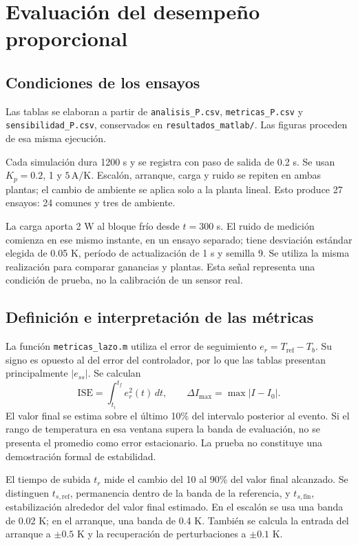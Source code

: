 \documentclass[journal,twocolumn]{IEEEtran}
\begin{document}
\section{Evaluación del desempeño proporcional}\label{sec:resultadosP}
\subsection{Condiciones de los ensayos}
Las tablas se elaboran a partir de \texttt{analisis\_P.csv}, \texttt{metricas\_P.csv} y \texttt{sensibilidad\_P.csv}, conservados en \texttt{resultados\_matlab/}. Las figuras proceden de esa misma ejecución.

Cada simulación dura 1200 s y se registra con paso de salida de 0.2 s. Se usan $K_p=0.2$, 1 y $5\,\mathrm{A/K}$. Escalón, arranque, carga y ruido se repiten en ambas plantas; el cambio de ambiente se aplica solo a la planta lineal. Esto produce 27 ensayos: 24 comunes y tres de ambiente.

La carga aporta 2 W al bloque frío desde $t=300$ s. El ruido de medición comienza en ese mismo instante, en un ensayo separado; tiene desviación estándar elegida de 0.05 K, período de actualización de 1 s y semilla 9. Se utiliza la misma realización para comparar ganancias y plantas. Esta señal representa una condición de prueba, no la calibración de un sensor real.

\subsection{Definición e interpretación de las métricas}
La función \texttt{metricas\_lazo.m} utiliza el error de seguimiento $e_r=T_{\mathrm{ref}}-T_b$. Su signo es opuesto al del error del controlador, por lo que las tablas presentan principalmente $|e_{ss}|$. Se calculan
\begin{equation}
\mathrm{ISE}=\int_{t_i}^{t_f}e_r^2(t)\,dt,
\qquad \Delta I_{\max}=\max |I-I_0|.
\end{equation}
El valor final se estima sobre el último 10\% del intervalo posterior al evento. Si el rango de temperatura en esa ventana supera la banda de evaluación, no se presenta el promedio como error estacionario. La prueba no constituye una demostración formal de estabilidad.

El tiempo de subida $t_r$ mide el cambio del 10 al 90\% del valor final alcanzado. Se distinguen $t_{s,\mathrm{ref}}$, permanencia dentro de la banda de la referencia, y $t_{s,\mathrm{fin}}$, estabilización alrededor del valor final estimado. En el escalón se usa una banda de 0.02 K; en el arranque, una banda de 0.4 K. También se calcula la entrada del arranque a $\pm0.5$ K y la recuperación de perturbaciones a $\pm0.1$ K.
\end{document}

